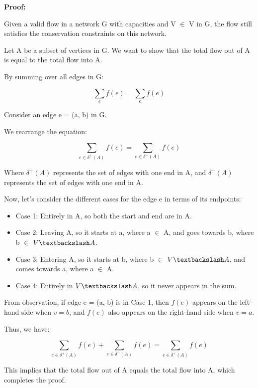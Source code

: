 \documentclass{article}
\begin{document}
    \textbf{Proof:}

Given a valid flow in a network G with capacities and V $\in$ V in G, the flow still satisfies the conservation constraints on this network.

Let A be a subset of vertices in G. We want to show that the total flow out of A is equal to the total flow into A.

By summing over all edges in G:

\begin{equation}
\sum_{e} f(e) = \sum_{e} f(e)
\end{equation}

Consider an edge e = (a, b) in G.

We rearrange the equation:

\begin{equation}
\sum_{e \in \delta^{+}(A)} f(e) = \sum_{e \in \delta^{-}(A)} f(e)
\end{equation}

Where $\delta^{+}(A)$ represents the set of edges with one end in A, and $\delta^{-}(A)$ represents the set of edges with one end in A.

Now, let's consider the different cases for the edge e in terms of its endpoints:

\begin{itemize}
\item Case 1: Entirely in A, so both the start and end are in A.
\item Case 2: Leaving A, so it starts at a, where a $\in$ A, and goes towards b, where b $\in$ $V \textbackslash A$.
\item Case 3: Entering A, so it starts at b, where b $\in$ $V \textbackslash A$, and comes towards a, where a $\in$ A.
\item Case 4: Entirely in $V \textbackslash A$, so it never appears in the sum.
\end{itemize}

From observation, if edge e = (a, b) is in Case 1, then $f(e)$ appears on the left-hand side when $v = b$, and $f(e)$ also appears on the right-hand side when $v = a$. 

Thus, we have:

\begin{equation}
\sum_{e \in \delta^{+}(A)} f(e) + \sum_{e \in \delta^{-}(A)} f(e) = \sum_{e \in \delta^{+}(A)} f(e)
\end{equation}

This implies that the total flow out of A equals the total flow into A, which completes the proof.
    
\end{document}
